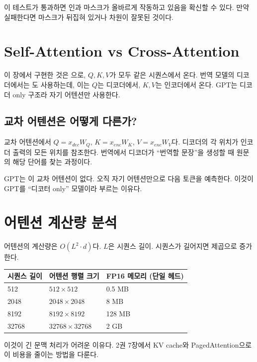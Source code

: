 이 테스트가 통과하면 인과 마스크가 올바르게 작동하고 있음을 확신할 수 있다. 만약 실패한다면 마스크가 뒤집혀 있거나 차원이 잘못된 것이다.

\section{Self-Attention vs Cross-Attention}

이 장에서 구현한 것은 으로, $Q, K, V$가 모두 같은 시퀀스에서 온다. 번역 모델의 디코더에서는 도 사용하는데, 이는 $Q$는 디코더에서, $K, V$는 인코더에서 온다. GPT는 디코더 only 구조라 자기 어텐션만 사용한다.

\subsection{교차 어텐션은 어떻게 다른가?}

교차 어텐션에서 $Q = x_{dec} W_Q$, $K = x_{enc} W_K$, $V = x_{enc} W_V$다. 디코더의 각 위치가 인코더 출력의 모든 위치를 참조한다. 번역에서 디코더가 ``번역할 문장''을 생성할 때 원문의 해당 단어를 찾는 과정이다.

GPT는 이 교차 어텐션이 없다. 오직 자기 어텐션만으로 다음 토큰을 예측한다. 이것이 GPT를 ``디코터 only'' 모델이라 부르는 이유다.

\section{어텐션 계산량 분석}

어텐션의 계산량은 $O(L^2 \cdot d)$다. $L$은 시퀀스 길이. 시퀀스가 길어지면 제곱으로 증가한다.

\begin{center}
\begin{tabularx}{\textwidth}{lXX}
\toprule
\textbf{시퀀스 길이} & \textbf{어텐션 행렬 크기} & \textbf{FP16 메모리 (단일 헤드)} \\
\midrule
512 & $512 \times 512$ & 0.5 MB \\
2048 & $2048 \times 2048$ & 8 MB \\
8192 & $8192 \times 8192$ & 128 MB \\
32768 & $32768 \times 32768$ & 2 GB \\
\bottomrule
\end{tabularx}
\end{center}

이것이 긴 문맥 처리가 어려운 이유다. 2권 7장에서 KV cache와 PagedAttention으로 이 비용을 줄이는 방법을 다룬다.

